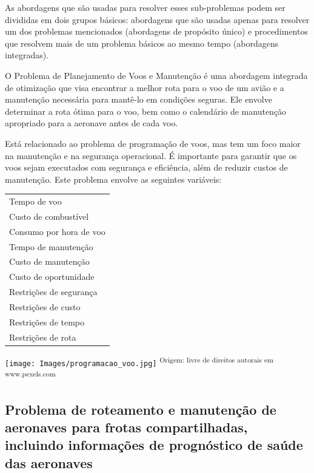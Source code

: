 \documentclass{article}
\begin{document}
As abordagens que são usadas para resolver esses sub-problemas podem ser divididas em dois grupos básicos: abordagens que são usadas apenas para resolver um dos problemas mencionados (abordagens de propósito único) e procedimentos que resolvem mais de um problema básicos ao mesmo tempo (abordagens integradas).

O Problema de Planejamento de Voos e Manutenção é uma abordagem integrada de otimização que visa encontrar a melhor rota para o voo de um avião e a manutenção necessária para mantê-lo em condições seguras. Ele envolve determinar a rota ótima para o voo, bem como o calendário de manutenção apropriado para a aeronave antes de cada voo.

Está relacionado ao problema de programação de voos, mas tem um foco maior na manutenção e na segurança operacional. É importante para garantir que os voos sejam executados com segurança e eficiência, além de reduzir custos de manutenção. Este problema envolve as seguintes variáveis:


\begin{minipage}[h]{.98\linewidth}
	\begin{minipage}[t]{0.33\linewidth}
		\begin{tabular}{l}\hline
		Tempo de voo\\
		Custo de combustível\\
		Consumo por hora de voo\\
		Tempo de manutenção\\
		Custo de manutenção\\
		Custo de oportunidade\\
		Restrições de segurança\\
		Restrições de custo\\
		Restrições de tempo\\
		Restrições de rota\\
		\end{tabular}
	\end{minipage}
	\hfill
	\begin{minipage}[t]{0.53\linewidth}
		\vspace{-2ex}
		\texttt{[image: Images/programacao\_voo.jpg]}
		\small\textsuperscript{Origem: livre de direitos autorais em www.pexels.com}
	\end{minipage}
\end{minipage}



\subsection{Problema de roteamento e manutenção de aeronaves para frotas compartilhadas, incluindo informações de prognóstico de saúde das aeronaves}
\end{document}
